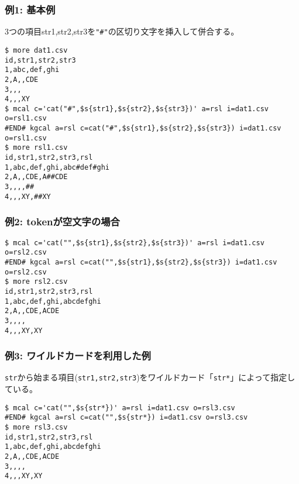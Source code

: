 \subsubsection*{例1: 基本例}

3つの項目str1,str2,str3を\verb|"#"|の区切り文字を挿入して併合する。


\begin{Verbatim}[baselinestretch=0.7,frame=single]
$ more dat1.csv
id,str1,str2,str3
1,abc,def,ghi
2,A,,CDE
3,,,
4,,,XY
$ mcal c='cat("#",$s{str1},$s{str2},$s{str3})' a=rsl i=dat1.csv o=rsl1.csv
#END# kgcal a=rsl c=cat("#",$s{str1},$s{str2},$s{str3}) i=dat1.csv o=rsl1.csv
$ more rsl1.csv
id,str1,str2,str3,rsl
1,abc,def,ghi,abc#def#ghi
2,A,,CDE,A##CDE
3,,,,##
4,,,XY,##XY
\end{Verbatim}
\subsubsection*{例2: tokenが空文字の場合}



\begin{Verbatim}[baselinestretch=0.7,frame=single]
$ mcal c='cat("",$s{str1},$s{str2},$s{str3})' a=rsl i=dat1.csv o=rsl2.csv
#END# kgcal a=rsl c=cat("",$s{str1},$s{str2},$s{str3}) i=dat1.csv o=rsl2.csv
$ more rsl2.csv
id,str1,str2,str3,rsl
1,abc,def,ghi,abcdefghi
2,A,,CDE,ACDE
3,,,,
4,,,XY,XY
\end{Verbatim}
\subsubsection*{例3: ワイルドカードを利用した例}

\verb|str|から始まる項目(\verb|str1,str2,str3|)をワイルドカード「\verb|str*|」によって指定している。


\begin{Verbatim}[baselinestretch=0.7,frame=single]
$ mcal c='cat("",$s{str*})' a=rsl i=dat1.csv o=rsl3.csv
#END# kgcal a=rsl c=cat("",$s{str*}) i=dat1.csv o=rsl3.csv
$ more rsl3.csv
id,str1,str2,str3,rsl
1,abc,def,ghi,abcdefghi
2,A,,CDE,ACDE
3,,,,
4,,,XY,XY
\end{Verbatim}
